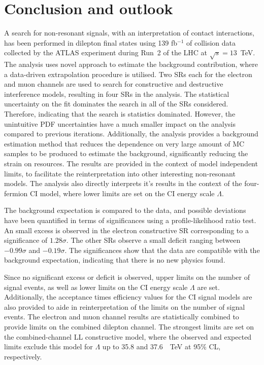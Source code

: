 \chapter{Conclusion and outlook}\label{chap:conclusion}

A search for non-resonant signals, with an interpretation of contact interactions, has been performed in dilepton final states using 139 fb$^{-1}$ of \protonproton collision data collected by the ATLAS experiment during Run~2 of the LHC at $\sqrt{s}=13$~TeV. The analysis uses novel approach to estimate the background contribution, where a data-driven extrapolation procedure is utilised. Two SRs each for the electron and muon channels are used to search for constructive and destructive interference models, resulting in four SRs in the analysis. The statistical uncertainty on the fit dominates the search in all of the SRs considered. Therefore, indicating that the search is statistics dominated. However, the unintuitive PDF uncertainties have a much smaller impact on the analysis compared to previous iterations. Additionally, the analysis provides a background estimation method that reduces the dependence on very large amount of MC samples to be produced to estimate the background, significantly reducing the strain on resources. The results are provided in the context of model independent limits, to facilitate the reinterpretation into other interesting non-resonant models. The analysis also directly interprets it's results in the context of the four-fermion CI model, where lower limits are set on the CI energy scale $\Lambda$. 

The background expectation is compared to the data, and possible deviations have been quantified in terms of significances using a profile-likelihood ratio test. An small excess is observed in the electron constructive SR corresponding to a significance of $1.28\sigma$. The other SRs observe a small deficit ranging between $-0.99\sigma$ and $ -0.19\sigma$. The significances show that the data are compatible with the background expectation, indicating that there is no new physics found. 

Since no significant excess or deficit is observed, upper limits on the number of signal events, as well as lower limits on the CI energy scale $\Lambda$ are set. Additionally, the acceptance times efficiency values for the CI signal models are also provided to aide in reinterpretation of the limits on the number of signal events. The electron and muon channel results are statistically combined to provide limits on the combined dilepton channel. The strongest limits are set on the combined-channel LL constructive model, where the observed and expected limits exclude this model for $\Lambda$ up to 35.8 and 37.6~\SI{}{\tera\electronvolt} at 95\% CL, respectively. 

